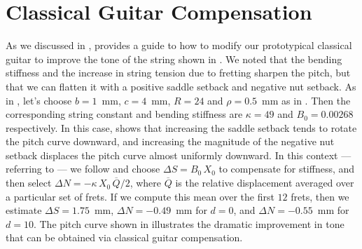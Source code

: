 %
%
%

 \section{Classical Guitar Compensation\label{sct:comp}}

As we discussed in ,  provides a guide to how to modify our prototypical classical guitar to improve the tone of the string shown in . We noted that the bending stiffness and the increase in string tension due to fretting sharpen the pitch, but that we can flatten it with a positive saddle setback and negative nut setback. As in , let's choose $b = 1$~mm, $c = 4$~mm, $R = 24$ and $\rho = 0.5$~mm as in . Then the corresponding string constant and bending stiffness are $\kappa = 49$ and $B_0 = 0.00268$ respectively. In this case,  shows that increasing the saddle setback tends to rotate the pitch curve downward, and increasing the magnitude of the negative nut setback displaces the pitch curve almost uniformly downward. In this context --- referring to  --- we follow  and choose $\Delta S = B_0\, X_0$ to compensate for stiffness, and then select $\Delta N = - \kappa\, X_0\, \overline{Q} / 2$, where $\overline{Q}$ is the relative displacement averaged over a particular set of frets. If we compute this mean over the first $12$ frets, then we estimate $\Delta S = 1.75$~mm, $\Delta N = -0.49$~mm for $d = 0$, and $\Delta N = -0.55$~mm for $d = 10$. The pitch curve shown in  illustrates the dramatic improvement in tone that can be obtained via classical guitar compensation.

